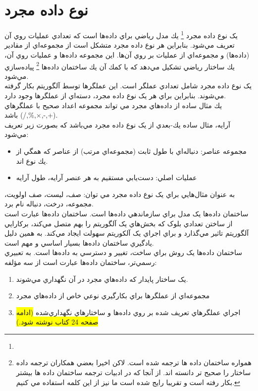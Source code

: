 \documentclass{book}
\begin{document}
	\section*{نوع داده مجرد‌}
	يک نوع داده مجرد  
	\footnote{}
	يك مدل رياضي براي داده‌ها است كه تعدادي عمليات روي آن تعريف مي‌شود. بنابراين هر نوع داده مجرد متشكل است از مجموعه‌اي از مقادير (داده‌ها) و مجموعه‌اي از عمليات بر روي آن‌ها. اين مجموعه داده‌ها و عمليات روي آن، يك ساختار رياضي تشكيل مي‌دهد که با كمك آن يك ساختمان داده‌ها
	\footnote{
		 همواره ساختمان داده ها ترجمه شده است. لاکن اخيرا بعضي همکاران ترجمه داده ساختار را صحيح تر دانسته اند. از آنجا که در ادبيات ترجمه ساختمان داده ها بيشتر بکار رفته است و تقريبا رايج شده است ما نيز از اين کلمه استفاده مي کنيم.
	}
	  پياده‌سازي مي‌شود.\\
	يک نوع داده مجرد‏ شامل تعدادي عملگر است. اين عملگرها توسط آلگوريتم بکار گرفته مي‌شوند. بنابراين براي هر يک نوع داده مجرد، ‏دسته‌اي از عملگرها وجود دارد.\\
	يك مثال ساده از داده‌هاي مجرد مي تواند مجموعه اعداد صحيح با عملگرهاي (+,-,×,\%,/)   باشد.\\
	آرايه، مثال ساده يك-بعدي از يک نوع داده مجرد‏ مي‌باشد كه بصورت زير تعريف مي‌شود:
	\begin{itemize}
		\item
مجموعه عناصر: دنباله‌اي با طول ثابت (مجموعه‌اي مرتب) از عناصر كه همگي از يك نوع اند.
		\item 
عمليات اصلي: دست‌يابي مستقيم به هر عنصر آرايه، طول آرايه
	\end{itemize}	
به عنوان مثال‌هايي براي يک نوع داده مجرد مي توان: صف، ليست، صف اولويت، مجموعه، درخت، دنباله نام برد.\\
ساختمان داده‌ها يک مدل براي سازماندهي داده‌ها است. ساختمان داده‌ها عبارت است از ساختن تعدادي بلوک که بخش‌هاي يک آلگوريتم را بهم متصل مي‌کند، برکارايي آلگوريتم تاثير مي‌گذارد و براي اجراي يک آلکوريتم سهولت ايجاد مي‌کند. به همين دليل يادگيري ساختمان داده‌ها بسيار اساسي و مهم است.\\
ساختمان داده‌ها يک روش براي ساخت، تغيير و دسترسي به داده‌ها است. به تعبيري رسمي‌تر، ساختمان داده‌ها عبارت است از سه مؤلفه: 
	\begin{enumerate}
	\item
يک ساختار پايدار که داده‌هاي مجرد در آن نگهداري مي‌شوند.
	\item 
مجموعه‌اي از عملگرها براي بکارگيري نوعي خاص از داده‌هاي مجرد
	\item 
اجراي عملگرهاي تعريف شده بر روي داده‌ها و ساختارهاي نگهداري‌شده 
{\colorbox{yellow}{(ادامه صفحه 24 کتاب نوشته شود.)}}
\end{enumerate}	
\end{document}
